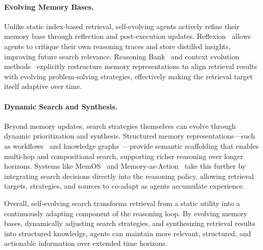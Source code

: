 \paragraph{Evolving Memory Bases.}  
Unlike static index-based retrieval, self-evolving agents actively refine their memory base through reflection and post-execution updates. Reflexion~\cite{shinn2023reflexion} allows agents to critique their own reasoning traces and store distilled insights, improving future search relevance. Reasoning Bank~\cite{ouyang2025reasoningbank} and context evolution methods~\cite{zhang2025agentic} explicitly restructure memory representations to align retrieval results with evolving problem-solving strategies, effectively making the retrieval target itself adaptive over time.

\paragraph{Dynamic Search and Synthesis.}  
Beyond memory updates, search strategies themselves can evolve through dynamic prioritization and synthesis. Structured memory representations—such as workflows~\cite{Li2024AutoFlowAW,zhang2024aflow,Zeng2023FlowMindAW} and knowledge graphs~\cite{Ouyang2024RepoGraphEA,Edge2024FromLT,chhikara2025mem0,rasmussen2025zep}—provide semantic scaffolding that enables multi-hop and compositional search, supporting richer reasoning over longer horizons. Systems like MemOS~\cite{li2025memos} and Memory-as-Action~\cite{zhang2025memory} take this further by integrating search decisions directly into the reasoning policy, allowing retrieval targets, strategies, and sources to co-adapt as agents accumulate experience.

Overall, self-evolving search transforms retrieval from a static utility into a continuously adapting component of the reasoning loop. By evolving memory bases, dynamically adjusting search strategies, and synthesizing retrieval results into structured knowledge, agents can maintain more relevant, structured, and actionable information over extended time horizons.

